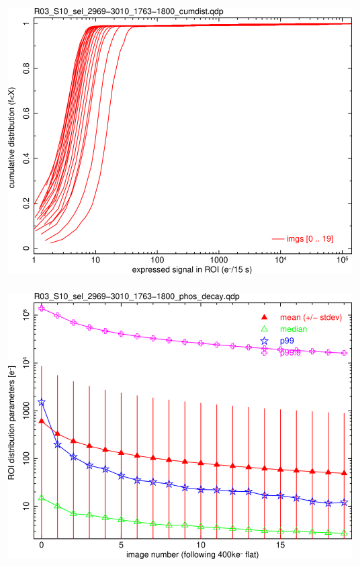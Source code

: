 \begin{figure}[!htbp]
\begin{subfigure}{0.45\textwidth}    
  \centering
  \includegraphics[width=\textwidth]{figures/phosphorescence-survey/phos_kinetics/R03_S10_sel_2969-3010_1763-1800_cumdist.png}    
\end{subfigure}
\hfil
\begin{subfigure}{0.45\textwidth}
  \centering
  \includegraphics[width=\textwidth]{figures/phosphorescence-survey/phos_kinetics/R03_S10_sel_2969-3010_1763-1800_phos_decay.png}
\end{subfigure}
\newline
\begin{subfigure}{0.45\textwidth}    

\end{subfigure}
\end{figure}
